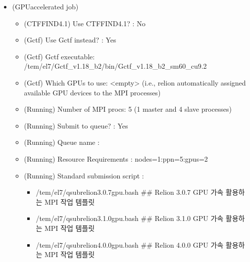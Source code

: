 \documentclass[a4paper,10pt,english]{sphinxmanual}
\begin{document}
\begin{itemize}
\item {} 
\sphinxAtStartPar
{} (GPU\sphinxhyphen{}accelerated job)
\begin{itemize}
\item {} 
\sphinxAtStartPar
(CTFFIND\sphinxhyphen{}4.1) Use CTFFIND\sphinxhyphen{}4.1? : No

\item {} 
\sphinxAtStartPar
(Gctf) Use Gctf instead? : Yes

\item {} 
\sphinxAtStartPar
(Gctf) Gctf executable: /tem/el7/Gctf\_v1.18\_b2/bin/Gctf\_v1.18\_b2\_sm60\_cu9.2

\item {} 
\sphinxAtStartPar
(Gctf) Which GPUs to use: <empty> (i.e., relion automatically assigned available GPU devices to the MPI processes)

\item {} 
\sphinxAtStartPar
(Running) Number of MPI procs: 5 (1 master and 4 slave processes)

\item {} 
\sphinxAtStartPar
(Running) Submit to queue? : Yes

\item {} 
\sphinxAtStartPar
(Running) Queue name : 

\item {} 
\sphinxAtStartPar
(Running) Resource Requirements : nodes=1:ppn=5:gpus=2

\item {} 
\sphinxAtStartPar
(Running) Standard submission script :
\begin{itemize}
\item {} 
\sphinxAtStartPar
/tem/el7/qsub\sphinxhyphen{}relion\sphinxhyphen{}3.0.7\sphinxhyphen{}gpu.bash           \#\# Relion 3.0.7 GPU 가속 활용하는 MPI 작업 템플릿

\item {} 
\sphinxAtStartPar
/tem/el7/qsub\sphinxhyphen{}relion\sphinxhyphen{}3.1.0\sphinxhyphen{}gpu.bash           \#\# Relion 3.1.0 GPU 가속 활용하는 MPI 작업 템플릿

\item {} 
\sphinxAtStartPar
/tem/el7/qsub\sphinxhyphen{}relion\sphinxhyphen{}4.0.0\sphinxhyphen{}gpu.bash           \#\# Relion 4.0.0 GPU 가속 활용하는 MPI 작업 템플릿

\end{itemize}

\end{itemize}

\end{itemize}
\end{document}
